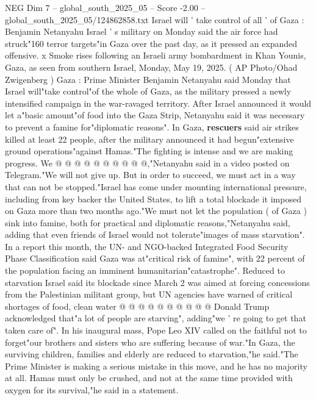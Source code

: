 \begin{textsample}{NEG Dim 7 – global\_south\_2025\_05 – Score -2.00 – global\_south\_2025\_05/124862858.txt}  \label{ex:f7_neg_004}
Israel will ' take control of all ' of Gaza : Benjamin Netanyahu Israel ' s military on Monday said the air force had struck"160 terror targets"in Gaza over the past day, as it pressed an expanded offensive. x Smoke rises following an Israeli army bombardment in Khan Younis, Gaza, as seen from southern Israel, Monday, May 19, 2025. ( AP Photo/Ohad Zwigenberg ) Gaza : Prime Minister Benjamin Netanyahu said Monday that Israel will"take control"of the whole of Gaza, as the military pressed a newly intensified campaign in the war-ravaged territory.
After Israel announced it would let a"basic amount"of food into the Gaza Strip, Netanyahu said it was necessary to prevent a famine for"diplomatic reasons".
In Gaza, \textbf{rescuers} said air strikes killed at least 22 people, after the military announced it had begun"extensive ground operations"against Hamas."The fighting is intense and we are making progress.
We @ @ @ @ @ @ @ @ @ @,"Netanyahu said in a video posted on Telegram."We will not give up.
But in order to succeed, we must act in a way that can not be stopped."Israel has come under mounting international pressure, including from key backer the United States, to lift a total blockade it imposed on Gaza more than two months ago."We must not let the population ( of Gaza ) sink into famine, both for practical and diplomatic reasons,"Netanyahu said, adding that even friends of Israel would not tolerate"images of mass starvation".
In a report this month, the UN- and NGO-backed Integrated Food Security Phase Classification said Gaza was at"critical risk of famine", with 22 percent of the population facing an imminent humanitarian"catastrophe".
Reduced to starvation Israel said its blockade since March 2 was aimed at forcing concessions from the Palestinian militant group, but UN agencies have warned of critical shortages of food, clean water @ @ @ @ @ @ @ @ @ @ Donald Trump acknowledged that"a lot of people are starving", adding"we ' re going to get that taken care of".
In his inaugural mass, Pope Leo XIV called on the faithful not to forget"our brothers and sisters who are suffering because of war."In Gaza, the surviving children, families and elderly are reduced to starvation,"he said."The Prime Minister is making a serious mistake in this move, and he has no majority at all.
Hamas must only be crushed, and not at the same time provided with oxygen for its survival,"he said in a statement.

\end{textsample}
